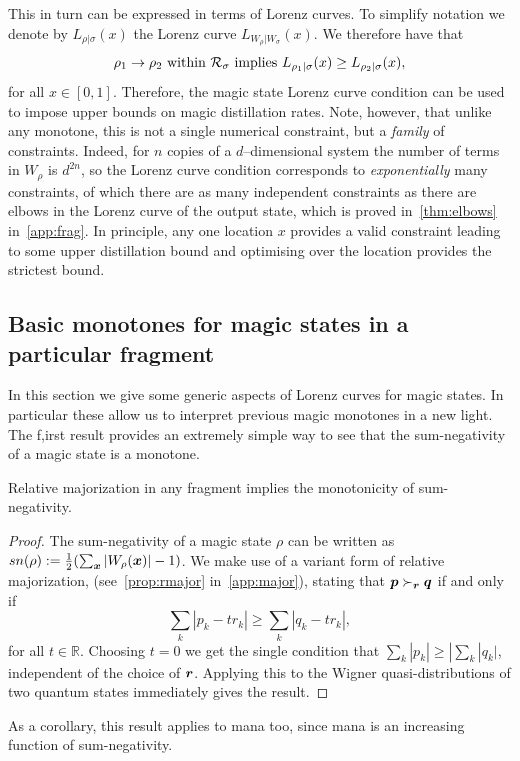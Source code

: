 \documentclass[pra,
aps,
twocolumn,
superscriptaddress,
groupedaddress,
nofootinbib,
reprint
]{revtex4-1}
\begin{document}
This in turn can be expressed in terms of Lorenz curves. To simplify notation we denote by $L_{\rho | \sigma}(x)$ the Lorenz curve $L_{W_{\rho} | W_{\sigma}} (x)$. We therefore have that
\begin{equation}
\rho_1 \rightarrow \rho_2 \mbox{ within }\mathcal{R}_\sigma \mbox{ implies } L_{\rho_1 |\sigma} (x) \ge L_{\rho_2 |\sigma} (x),
\end{equation}
for all $x \in [0,1]$. Therefore, the magic state Lorenz curve condition can be used to impose upper bounds on magic distillation rates. Note, however, that unlike any monotone, this is not a single numerical constraint, but a \emph{family} of constraints. Indeed, for $n$ copies of a $d$--dimensional system the number of terms in $W_{\rho}$ is $d^{2n}$, so the Lorenz curve condition corresponds to \emph{exponentially} many constraints, of which there are as many independent constraints as there are elbows in the Lorenz curve of the output state, which is proved in~\cref{thm:elbows} in~\cref{app:frag}.
In principle, any one location $x$ provides a valid constraint leading to some upper distillation bound and optimising over the location provides the strictest bound.

\subsection{Basic monotones for magic states in a particular fragment}
\label{sec:monotones_frag}

In this section we give some generic aspects of Lorenz curves for magic states. In particular these allow us to interpret previous magic monotones in a new light. The f,irst result provides an extremely simple way to see that the sum-negativity of a magic state is a monotone.

\begin{lemma} Relative majorization in any fragment implies the monotonicity of sum-negativity. 
\end{lemma}
\begin{proof}
	The sum-negativity of a magic state $\rho$ can be written as $sn(\rho) := \frac{1}{2} (\sum_{\boldsymbol{x}} |W_\rho(\boldsymbol{x}) | - 1)$.
We make use of a variant form of relative majorization, (see~\cref{prop:rmajor} in~\cref{app:major}), stating that $\boldsymbol{p} \succ_{\boldsymbol{r}} \boldsymbol{q}$ if and only if
	\begin{equation}
\sum_k | p_k - t r_k | \ge \sum_k |q_k - t r_k|,
\end{equation}
for all $t\in \mathbb{R}$. Choosing $t=0$ we get the single condition that $\sum_k |p_k| \ge |\sum_k |q_k|$, independent of the choice of $\boldsymbol{r}$. Applying this to the Wigner quasi-distributions of two quantum states immediately gives the result.
\end{proof}
As a corollary, this result applies to mana too, since mana is an increasing function of sum-negativity.
\end{document}
